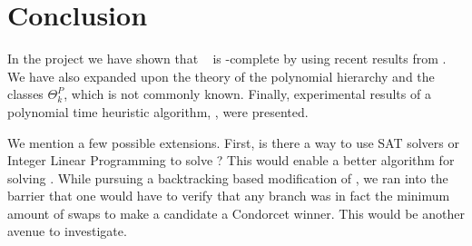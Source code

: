 \section{Conclusion}

In the project we have shown that \dwin~ is \tp-complete by using recent
results from \citet{compsat}.
We have also expanded upon the theory of the polynomial hierarchy and the classes
$\Theta_k^P$, which is not commonly known.
Finally, experimental results of a polynomial time heuristic algorithm,
\gwin, were presented.

We mention a few possible extensions.
First, is there a way to use SAT solvers or Integer Linear Programming to
solve \dscore?
This would enable a better algorithm for solving \dwin.
While pursuing a backtracking based modification of \gwin, we ran into the
barrier that one would have to verify that any branch was in fact the minimum
amount of swaps to make a candidate a Condorcet winner.
This would be another avenue to investigate.